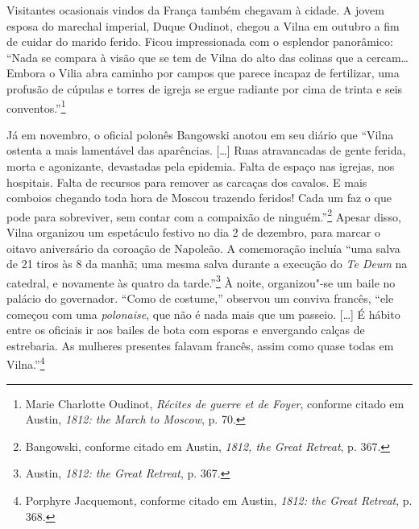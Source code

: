 Visitantes ocasionais vindos da França também chegavam à cidade. A jovem
esposa do marechal imperial, Duque Oudinot, chegou a Vilna em outubro a
fim de cuidar do marido ferido. Ficou impressionada com o esplendor
panorâmico: ``Nada se compara à visão que se tem de Vilna do alto das
colinas que a cercam\ldots{} Embora o Vilia abra caminho por campos que
parece incapaz de fertilizar, uma profusão de cúpulas e torres de igreja
se ergue radiante por cima de trinta e seis conventos.''\footnote{Marie Charlotte Oudinot, \textit{Récites de guerre et de Foyer}, conforme citado em Austin, \textit{1812: the March to Moscow}, p. 70.}

Já em novembro, o oficial polonês Bangowski anotou em seu diário que
``Vilna ostenta a mais lamentável das aparências. [\ldots{}] Ruas
atravancadas de gente ferida, morta e agonizante, devastadas pela
epidemia. Falta de espaço nas igrejas, nos hospitais. Falta de recursos
para remover as carcaças dos cavalos. E mais comboios chegando toda hora
de Moscou trazendo feridos! Cada um faz o que pode para sobreviver, sem
contar com a compaixão de ninguém.''\footnote{Bangowski, conforme citado em Austin, \textit{1812, the Great Retreat}, p. 367.} Apesar disso, Vilna organizou um espetáculo festivo no dia 2 de dezembro, para marcar
o oitavo aniversário da coroação de Napoleão. A comemoração incluía
``uma salva de 21 tiros às 8 da manhã; uma mesma salva durante a
execução do \textit{Te Deum} na catedral, e novamente às quatro da
tarde.''\footnote{Austin, \textit{1812: the Great Retreat}, p. 367.} À
noite, organizou"-se um baile no palácio do governador. ``Como de
costume,'' observou um conviva francês, ``ele começou com uma \textit{polonaise},
que não é nada mais que um passeio. [\ldots{}] É hábito entre os oficiais
ir aos bailes de bota com esporas e envergando calças de estrebaria. As
mulheres presentes falavam francês, assim como quase todas em
Vilna.''\footnote{Porphyre Jacquemont, conforme citado em Austin, \textit{1812: the Great Retreat}, p. 368.}

